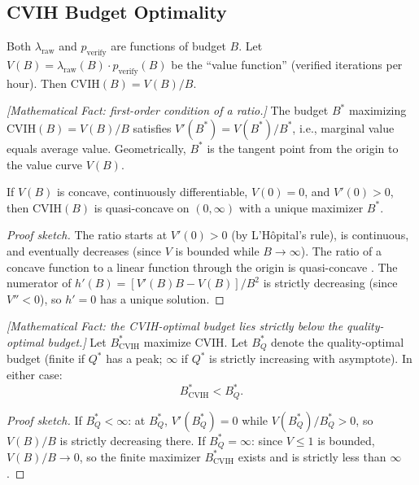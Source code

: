 \subsection{CVIH Budget Optimality}

Both $\lambda_{\text{raw}}$ and $p_{\text{verify}}$ are functions of budget $B$. Let $V(B) = \lambda_{\text{raw}}(B) \cdot p_{\text{verify}}(B)$ be the ``value function'' (verified iterations per hour). Then $\text{CVIH}(B) = V(B)/B$.

\begin{theorem}
\label{thm:econ-cvih-tangent}
\emph{[Mathematical Fact: first-order condition of a ratio.]}
The budget $B^*$ maximizing $\text{CVIH}(B) = V(B)/B$ satisfies $V'(B^*) = V(B^*)/B^*$, i.e., marginal value equals average value. Geometrically, $B^*$ is the tangent point from the origin to the value curve $V(B)$.
\end{theorem}

\begin{theorem}
\label{thm:econ-cvih-quasi}
If $V(B)$ is concave, continuously differentiable, $V(0) = 0$, and $V'(0) > 0$, then $\text{CVIH}(B)$ is quasi-concave on $(0, \infty)$ with a unique maximizer $B^*$.
\end{theorem}

\begin{proof}[Proof sketch]
The ratio starts at $V'(0) > 0$ (by L'H\^{o}pital's rule), is continuous, and eventually decreases (since $V$ is bounded while $B \to \infty$). The ratio of a concave function to a linear function through the origin is quasi-concave \citep{boyd2004}. The numerator of $h'(B) = [V'(B)B - V(B)]/B^2$ is strictly decreasing (since $V'' < 0$), so $h' = 0$ has a unique solution.
\end{proof}

\begin{theorem}
\label{thm:econ-budget-sep}
\emph{[Mathematical Fact: the CVIH-optimal budget lies strictly below the quality-optimal budget.]}
Let $B^*_{\text{CVIH}}$ maximize CVIH. Let $B^*_Q$ denote the quality-optimal budget (finite if $Q^*$ has a peak; $\infty$ if $Q^*$ is strictly increasing with asymptote). In either case:
\begin{equation}\label{eq:econ-budget-sep}
    B^*_{\text{CVIH}} < B^*_Q.
\end{equation}
\end{theorem}

\begin{proof}[Proof sketch]
If $B^*_Q < \infty$: at $B^*_Q$, $V'(B^*_Q) = 0$ while $V(B^*_Q)/B^*_Q > 0$, so $V(B)/B$ is strictly decreasing there. If $B^*_Q = \infty$: since $V \leq 1$ is bounded, $V(B)/B \to 0$, so the finite maximizer $B^*_{\text{CVIH}}$ exists and is strictly less than $\infty$.
\end{proof}

